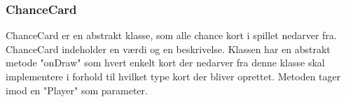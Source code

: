\subsubsection{ChanceCard}
ChanceCard er en abstrakt klasse, som alle chance kort i spillet nedarver fra. ChanceCard indeholder en værdi og en beskrivelse. Klassen har en abstrakt metode "onDraw" som hvert enkelt kort der nedarver fra denne klasse skal implementere i forhold til hvilket type kort der bliver oprettet. Metoden tager imod en "Player" som parameter.